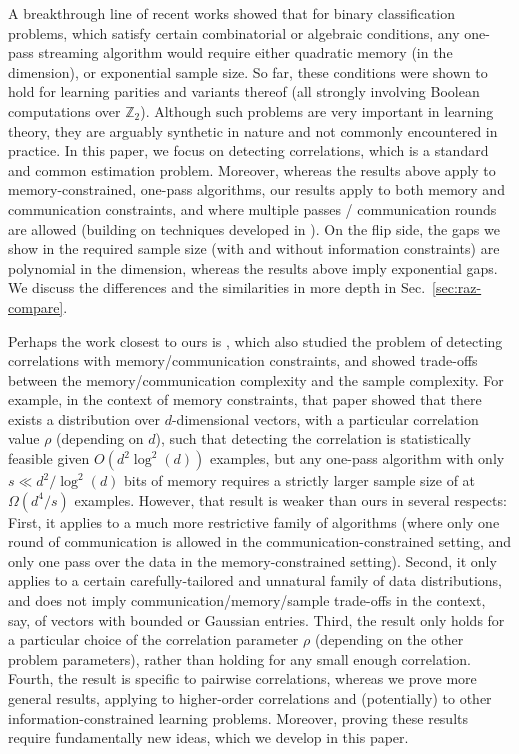 \documentclass[final, 12pt]{colt2018}
\newcommand{\secref}[1]{Sec.~\ref{#1}}
\begin{document}
\begin{itemize}[leftmargin=*]
	A breakthrough line of recent works  
\citep{raz2016fast,raz2017time,moshkovitz2017mixing,moshkovitz2017strongmixing,kol2017time,garg2017extractor,beame2017time}
	showed that for binary classification problems, which satisfy certain combinatorial or algebraic conditions, any one-pass streaming algorithm would require either quadratic memory (in the dimension), or exponential sample size. So far, these conditions were shown to hold for learning parities and variants thereof (all strongly involving Boolean computations over $\mathbb{Z}_2$). Although such problems are very important in learning theory, they are arguably synthetic in nature and not commonly encountered in practice. In this paper, we focus on detecting correlations, which is a standard and common estimation problem. Moreover, whereas the results above apply to memory-constrained, one-pass 
	algorithms, our results apply to both memory and communication constraints, and where multiple passes / communication rounds are allowed (building on techniques developed in \cite{braverman2016communication}). On the flip side, the gaps we show in the required sample size (with and without information constraints) are polynomial in the dimension, whereas the results above imply exponential gaps. We discuss the differences and the similarities in more depth in \secref{sec:raz-compare}.
\end{itemize}

Perhaps the work closest to ours is \citet{shamir2014fundamental}, which also 
studied the problem of detecting correlations with memory/communication 
constraints, and showed trade-offs between the memory/communication complexity and the sample complexity. For example, in the context of memory constraints, that paper showed that there exists a distribution over $d$-dimensional vectors, with a particular correlation value $\rho$ (depending on $d$), such that detecting the correlation is statistically feasible given $O(d^2\log^2(d))$ examples, but any one-pass algorithm with only $s\ll d^2/\log^2(d)$ bits of memory requires a strictly larger sample size of at $\Omega(d^4/s)$ examples. However, that result is weaker than ours in several respects: First, it applies to a much more restrictive family of algorithms (where only one round of communication is allowed in the communication-constrained setting, and only one pass over the data in the memory-constrained setting). Second, it only 
applies to a certain carefully-tailored and unnatural family of data 
distributions, and does not imply communication/memory/sample trade-offs in the 
context, say, of vectors with bounded or Gaussian entries. Third, the result 
only holds for a particular choice of the correlation parameter $\rho$ 
(depending on the other problem parameters), rather 
than holding for any small enough correlation. Fourth, the result is specific to pairwise correlations, whereas we prove more general results, applying to  higher-order correlations and (potentially) to other information-constrained learning problems. Moreover, proving these results require fundamentally new ideas, which we develop in this paper.
\end{document}
